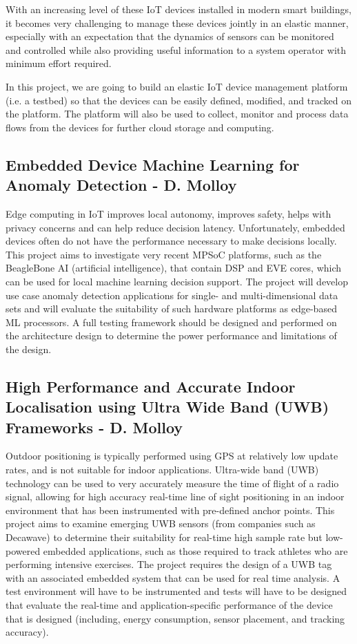 \documentclass[a4paper]{article}
\begin{document}
With an increasing level of these IoT devices installed in modern smart buildings, it becomes very challenging to manage these devices jointly in an elastic manner, especially with an expectation that the dynamics of sensors can be monitored and controlled while also providing useful information to a system operator with minimum effort required.

In this project, we are going to build an elastic IoT device management platform (i.e. a testbed) so that the devices can be easily defined, modified, and tracked on the platform. The platform will also be used to collect, monitor and process data flows from the devices for further cloud storage and computing.

\subsection{Embedded Device Machine Learning for Anomaly Detection - D. Molloy}
Edge computing in IoT improves local autonomy, improves safety, helps with privacy concerns and can help reduce decision latency. Unfortunately, embedded devices often do not have the performance necessary to make decisions locally. This project aims to investigate very recent MPSoC platforms, such as the BeagleBone AI (artificial intelligence), that contain DSP and EVE cores, which can be used for local machine learning decision support. The project will develop use case anomaly detection applications for single- and multi-dimensional data sets and will evaluate the suitability of such hardware platforms as edge-based ML processors. A full testing framework should be designed and performed on the architecture design to determine the power performance and limitations of the design.

\subsection{High Performance and Accurate Indoor Localisation using Ultra Wide
Band (UWB) Frameworks - D. Molloy}


Outdoor positioning is typically performed using GPS at relatively low update rates, and is not suitable for indoor applications. Ultra-wide band (UWB) technology can be used to very accurately measure the time of flight of a radio signal, allowing for
high accuracy real-time line of sight positioning in an indoor environment that has been instrumented with pre-defined anchor points. This project aims to examine emerging UWB sensors (from companies such as Decawave) to determine their suitability for real-time high sample rate but low-powered embedded applications, such as those required to track athletes who are performing intensive exercises. The project requires the design of a UWB tag with an associated embedded system that can be used for real time analysis. A test environment will have to be instrumented and tests will have to be designed that evaluate
the real-time and application-specific performance of the device that is designed (including, energy consumption, sensor placement, and tracking accuracy).
\end{document}
